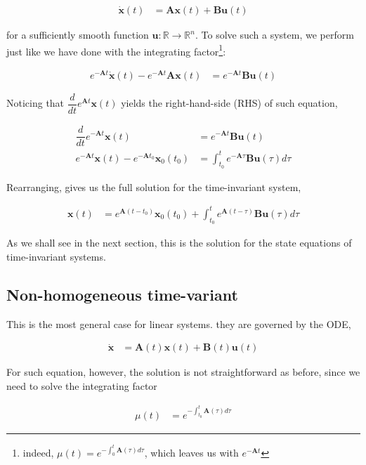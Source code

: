 \documentclass[12pt]{article}
\begin{document}
	\begin{align}
	\dot{\mathbf{x}}(t) &= \mathbf{Ax}(t) + \mathbf{Bu}(t)
	\end{align}
	
	for a sufficiently smooth function $\mathbf{u}:\mathbb{R}\rightarrow\mathbb{R}^{n}$. To solve such a system, we perform just like we have done with the integrating factor\footnote{indeed, $\mu(t) = e^{-\int_{0}^{t}\mathbf{A}(\tau)d\tau}$, which leaves us with $e^{-\mathbf{A}t}$}:
	
	\begin{align}
	e^{-\mathbf{A}t}\dot{\mathbf{x}}(t) - e^{-\mathbf{A}t}\mathbf{A}\mathbf{x}(t)&= e^{-\mathbf{A}t}\mathbf{Bu}(t)
	\end{align}
	
	Noticing that $\dfrac{d}{dt} e^{\mathbf{A}t}\mathbf{x}(t)$ yields the right-hand-side (RHS) of such equation,
	
	\begin{align}
	\dfrac{d}{dt}e^{-\mathbf{A}t}\mathbf{x}(t) &= e^{-\mathbf{A}t}\mathbf{Bu}(t)\\
	e^{-\mathbf{A}t}\mathbf{x}(t) - e^{-\mathbf{A}t_{0}}\mathbf{x}_{0}(t_{0}) &= \int_{t_{0}}^{t}e^{-\mathbf{A}\tau}\mathbf{Bu}(\tau)d\tau 
	\end{align}
	
	Rearranging, gives us the full solution for the time-invariant system,
	
	\begin{align}
	\mathbf{x}(t) &= e^{\mathbf{A}(t-t_{0})}\mathbf{x}_{0}(t_{0}) + \int_{t_{0}}^{t}e^{\mathbf{A}(t-\tau)}\mathbf{Bu}(\tau)d\tau
	\end{align}
	
	As we shall see in the next section, this is the solution for the state equations of time-invariant systems.
	\subsection{Non-homogeneous time-variant}
	This is the most general case for linear systems. they are governed by the ODE,
	
	\begin{align}
	\dot{\mathbf{x}} &= \mathbf{A}(t)\mathbf{x}(t) + \mathbf{B}(t)\mathbf{u}(t)
	\end{align}
	
	For such equation, however, the solution is not straightforward as before, since we need to solve the integrating factor
	
	\begin{align}
	\mu(t) &= e^{-\int_{t_{0}}^{t}\mathbf{A}(\tau)d\tau}
	\end{align}
	
\end{document}
